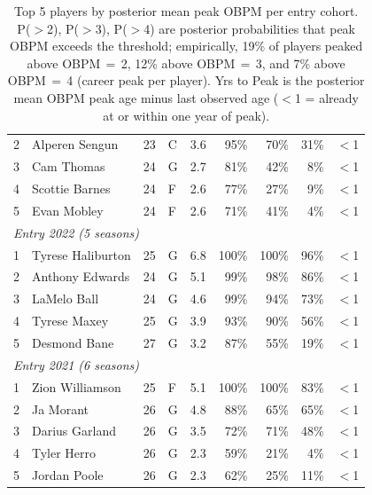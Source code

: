 \begin{table}[htbp]
\begin{tabular}{rlrlrrrrr}
    2 & Alperen Sengun & 23 & C & 3.6 & 95\% & 70\% & 31\% & $<$1 \\
    3 & Cam Thomas & 24 & G & 2.7 & 81\% & 42\% & 8\% & $<$1 \\
    4 & Scottie Barnes & 24 & F & 2.6 & 77\% & 27\% & 9\% & $<$1 \\
    5 & Evan Mobley & 24 & F & 2.6 & 71\% & 41\% & 4\% & $<$1 \\
    \midrule[0.4pt]
    \multicolumn{9}{l}{\textit{Entry 2022 (5 seasons)}} \\
    \midrule
    1 & Tyrese Haliburton & 25 & G & 6.8 & 100\% & 100\% & 96\% & $<$1 \\
    2 & Anthony Edwards & 24 & G & 5.1 & 99\% & 98\% & 86\% & $<$1 \\
    3 & LaMelo Ball & 24 & G & 4.6 & 99\% & 94\% & 73\% & $<$1 \\
    4 & Tyrese Maxey & 25 & G & 3.9 & 93\% & 90\% & 56\% & $<$1 \\
    5 & Desmond Bane & 27 & G & 3.2 & 87\% & 55\% & 19\% & $<$1 \\
    \midrule[0.4pt]
    \multicolumn{9}{l}{\textit{Entry 2021 (6 seasons)}} \\
    \midrule
    1 & Zion Williamson & 25 & F & 5.1 & 100\% & 100\% & 83\% & $<$1 \\
    2 & Ja Morant & 26 & G & 4.8 & 88\% & 65\% & 65\% & $<$1 \\
    3 & Darius Garland & 26 & G & 3.5 & 72\% & 71\% & 48\% & $<$1 \\
    4 & Tyler Herro & 26 & G & 2.3 & 59\% & 21\% & 4\% & $<$1 \\
    5 & Jordan Poole & 26 & G & 2.3 & 62\% & 25\% & 11\% & $<$1 \\
    \bottomrule
  \end{tabular}
  \caption{Top 5 players by posterior mean peak OBPM per entry cohort. P($>$2), P($>$3), P($>$4) are posterior probabilities that peak OBPM exceeds the threshold; empirically, 19\% of players peaked above OBPM\,$=$\,2, 12\% above OBPM\,$=$\,3, and 7\% above OBPM\,$=$\,4 (career peak per player). Yrs to Peak is the posterior mean OBPM peak age minus last observed age ($<$1 = already at or within one year of peak).}
  \label{tab:breakout_cohort}
\end{table}

